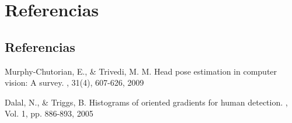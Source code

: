 \chapter{Referencias}

\section{Referencias}
\begin{thebibliography}{14}
 		
	\bibitem{}
	Murphy-Chutorian, E., \& Trivedi, M. M. 
	\newblock Head pose estimation in computer vision: A survey.
	, 31(4), 607-626, 2009
 		
	\bibitem{}
	Dalal, N., \& Triggs, B. 
	\newblock Histograms of oriented gradients for human detection.
	, Vol. 1, pp. 886-893,  2005
	

 		
 		
\end{thebibliography}

